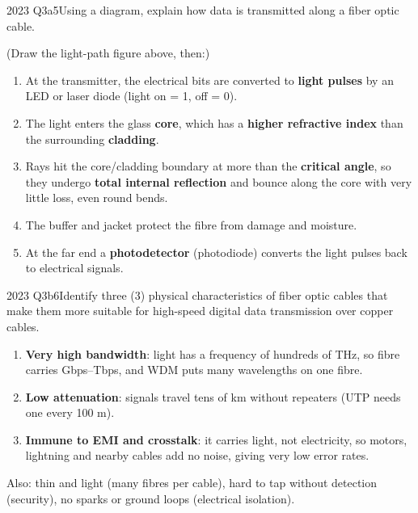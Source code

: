 \documentclass[10pt]{article}
\begin{document}
\begin{pastq}{2023 Q3a}{5}Using a diagram, explain how data is transmitted along a fiber optic cable.\end{pastq}
\begin{ans}
(Draw the light-path figure above, then:)
\begin{enumerate}
\item At the transmitter, the electrical bits are converted to \textbf{light pulses} by an LED or laser diode (light on = 1, off = 0).
\item The light enters the glass \textbf{core}, which has a \textbf{higher refractive index} than the surrounding \textbf{cladding}.
\item Rays hit the core/cladding boundary at more than the \textbf{critical angle}, so they undergo \textbf{total internal reflection} and bounce along the core with very little loss, even round bends.
\item The buffer and jacket protect the fibre from damage and moisture.
\item At the far end a \textbf{photodetector} (photodiode) converts the light pulses back to electrical signals.
\end{enumerate}
\end{ans}

\begin{pastq}{2023 Q3b}{6}Identify three (3) physical characteristics of fiber optic cables that make them more suitable for high-speed digital data transmission over copper cables.\end{pastq}
\begin{ans}
\begin{enumerate}
\item \textbf{Very high bandwidth}: light has a frequency of hundreds of THz, so fibre carries Gbps--Tbps, and WDM puts many wavelengths on one fibre.
\item \textbf{Low attenuation}: signals travel tens of km without repeaters (UTP needs one every 100 m).
\item \textbf{Immune to EMI and crosstalk}: it carries light, not electricity, so motors, lightning and nearby cables add no noise, giving very low error rates.
\end{enumerate}
Also: thin and light (many fibres per cable), hard to tap without detection (security), no sparks or ground loops (electrical isolation).
\end{ans}
\end{document}
